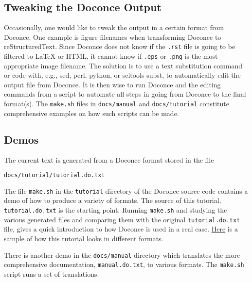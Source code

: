 \documentclass[%
oneside,                 %
final,                   %
10pt]{article}
\begin{document}
\subsection{Tweaking the Doconce Output}

Occasionally, one would like to tweak the output in a certain format
from Doconce. One example is figure filenames when transforming
Doconce to reStructuredText. Since Doconce does not know if the
{\fontsize{10pt}{10pt}\Verb!.rst!} file is going to be filtered to {\LaTeX} or HTML, it cannot know
if {\fontsize{10pt}{10pt}\Verb!.eps!} or {\fontsize{10pt}{10pt}\Verb!.png!} is the most appropriate image filename.
The solution is to use a text substitution command or code with, e.g., sed,
perl, python, or scitools subst, to automatically edit the output file
from Doconce. It is then wise to run Doconce and the editing commands
from a script to automate all steps in going from Doconce to the final
format(s). The {\fontsize{10pt}{10pt}\Verb!make.sh!} files in {\fontsize{10pt}{10pt}\Verb!docs/manual!} and {\fontsize{10pt}{10pt}\Verb!docs/tutorial!}
constitute comprehensive examples on how such scripts can be made.

\subsection{Demos}

The current text is generated from a Doconce format stored in the file
\begin{Verbatim}[fontsize=\fontsize{9pt}{9pt},tabsize=8,baselinestretch=0.85,
fontfamily=tt,xleftmargin=7mm]
docs/tutorial/tutorial.do.txt
\end{Verbatim}
\noindent
The file {\fontsize{10pt}{10pt}\Verb!make.sh!} in the {\fontsize{10pt}{10pt}\Verb!tutorial!} directory of the
Doconce source code contains a demo of how to produce a variety of
formats.  The source of this tutorial, {\fontsize{10pt}{10pt}\Verb!tutorial.do.txt!} is the
starting point.  Running {\fontsize{10pt}{10pt}\Verb!make.sh!} and studying the various generated
files and comparing them with the original {\fontsize{10pt}{10pt}\Verb!tutorial.do.txt!} file,
gives a quick introduction to how Doconce is used in a real case.
\href{{https://doconce.googlecode.com/hg/doc/demos/tutorial/index.html}}{Here}
is a sample of how this tutorial looks in different formats.

There is another demo in the {\fontsize{10pt}{10pt}\Verb!docs/manual!} directory which
translates the more comprehensive documentation, {\fontsize{10pt}{10pt}\Verb!manual.do.txt!}, to
various formats. The {\fontsize{10pt}{10pt}\Verb!make.sh!} script runs a set of translations.
\end{document}
